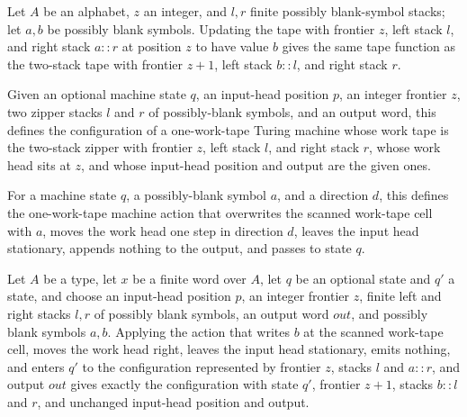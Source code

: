\begin{lemma}
\label{Turing.FinTM.sweepTape_right}
\leanok
{}
Let $A$ be an alphabet, $z$ an integer, and $l,r$ finite possibly blank-symbol stacks;
let $a,b$ be possibly blank symbols. Updating the tape with frontier $z$, left stack
$l$, and right stack $a::r$ at position $z$ to have value $b$ gives the same tape
function as the two-stack tape with frontier $z+1$, left stack $b::l$, and right stack
$r$.
\end{lemma}

\begin{definition}
\label{Turing.FinTM.sweepCfg}
\leanok
{}
Given an optional machine state $q$, an input-head position $p$, an integer
frontier $z$, two zipper stacks $l$ and $r$ of possibly-blank symbols, and an
output word, this defines the configuration of a one-work-tape Turing machine
whose work tape is the two-stack zipper with frontier $z$, left stack $l$, and
right stack $r$, whose work head sits at $z$, and whose input-head position
and output are the given ones.
\end{definition}

\begin{definition}
\label{Turing.FinTM.sweepAct}
\leanok
{}
For a machine state $q$, a possibly-blank symbol $a$, and a direction $d$,
this defines the one-work-tape machine action that overwrites the scanned
work-tape cell with $a$, moves the work head one step in direction $d$, leaves
the input head stationary, appends nothing to the output, and passes to
state $q$.
\end{definition}

\begin{lemma}
\label{Turing.FinTM.sweepCfg_right}
\leanok
{}
Let $A$ be a type, let $x$ be a finite word over $A$, let $q$ be an optional state and
$q'$ a state, and choose an input-head position $p$, an integer frontier $z$, finite
left and right stacks $l,r$ of possibly blank symbols, an output word $out$, and
possibly blank symbols $a,b$. Applying the action that writes $b$ at the scanned
work-tape cell, moves the work head right, leaves the input head stationary, emits
nothing, and enters $q'$ to the configuration represented by frontier $z$, stacks $l$
and $a::r$, and output $out$ gives exactly the configuration with state $q'$, frontier
$z+1$, stacks $b::l$ and $r$, and unchanged input-head position and output.
\end{lemma}


